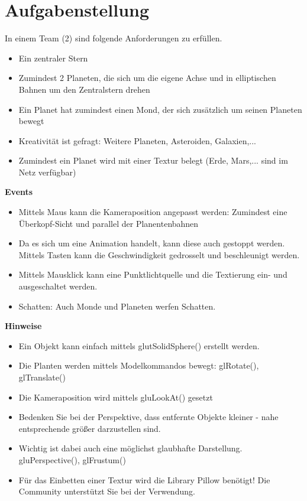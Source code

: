 \section{Aufgabenstellung}
\label{sec:Introduction}

In einem Team (2) sind folgende Anforderungen zu erfüllen.
\begin{itemize}
\item Ein zentraler Stern
\item Zumindest 2 Planeten, die sich um die eigene Achse und in elliptischen Bahnen um den Zentralstern drehen
\item Ein Planet hat zumindest einen Mond, der sich zusätzlich um seinen Planeten bewegt
\item Kreativität ist gefragt: Weitere Planeten, Asteroiden, Galaxien,...
\item Zumindest ein Planet wird mit einer Textur belegt (Erde, Mars,... sind im Netz verfügbar)
\end{itemize}

\textbf{Events}
\begin{itemize}
\item Mittels Maus kann die Kameraposition angepasst werden: Zumindest eine Überkopf-Sicht und parallel der Planentenbahnen
\item Da es sich um eine Animation handelt, kann diese auch gestoppt werden. Mittels Tasten kann die Geschwindigkeit gedrosselt und beschleunigt werden.
\item Mittels Mausklick kann eine Punktlichtquelle und die Textierung ein- und ausgeschaltet werden.
\item Schatten: Auch Monde und Planeten werfen Schatten.
\end{itemize}

\textbf{Hinweise}
\begin{itemize}
\item Ein Objekt kann einfach mittels glutSolidSphere() erstellt werden.
\item Die Planten werden mittels Modelkommandos bewegt: glRotate(), glTranslate()
\item Die Kameraposition wird mittels gluLookAt() gesetzt
\item Bedenken Sie bei der Perspektive, dass entfernte Objekte kleiner - nahe entsprechende größer darzustellen sind.
\item Wichtig ist dabei auch eine möglichst glaubhafte Darstellung. gluPerspective(), glFrustum()
\item Für das Einbetten einer Textur wird die Library Pillow benötigt! Die Community unterstützt Sie bei der Verwendung.
\end{itemize}

